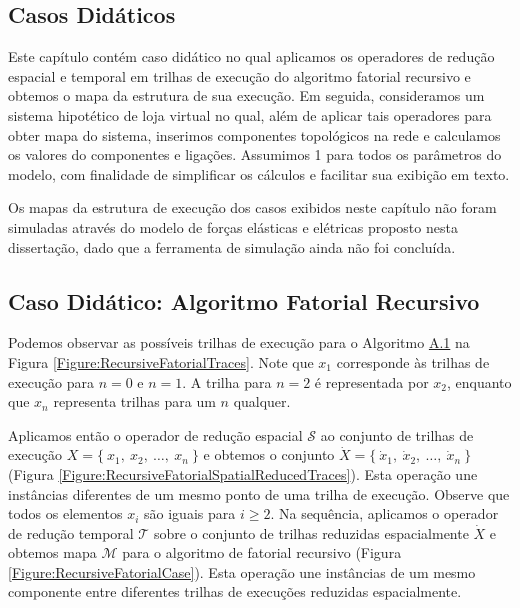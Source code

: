
%

\begin{apendicesenv}
\partapendices

\chapter{Casos Didáticos}
\label{Chapter:SpatialTemporalOperators}

Este capítulo contém caso didático no qual aplicamos os operadores de redução
espacial e temporal em trilhas de execução do algoritmo fatorial recursivo e
obtemos o mapa da estrutura de sua execução.
Em seguida, consideramos um sistema hipotético de loja virtual no qual, além de
aplicar tais operadores para obter mapa do sistema, inserimos componentes
topológicos na rede e calculamos os valores do componentes e ligações.
Assumimos 1 para todos os parâmetros do modelo, com finalidade de simplificar os
cálculos e facilitar sua exibição em texto.

Os mapas da estrutura de execução dos casos exibidos neste capítulo não foram
simuladas através do modelo de forças elásticas e elétricas proposto nesta
dissertação, dado que a ferramenta de simulação ainda não foi concluída.

\section{Caso Didático: Algoritmo Fatorial Recursivo}

Podemos observar as possíveis trilhas de execução para o Algoritmo
\hyperref[Algorithm:RecursiveFactorial]{A.1} na Figura
\ref{Figure:RecursiveFatorialTraces}. Note que $x_1$ corresponde às trilhas de
execução para $n = 0$ e $n = 1$. A trilha para $n = 2$ é representada por $x_2$,
enquanto que $x_n$ representa trilhas para um $n$ qualquer.



Aplicamos então o operador de redução espacial $\mathcal{S}$ ao conjunto 
de trilhas de execução $X = \{\ x_1,\ x_2,\ \dots,\ x_n\ \}$ e obtemos o
conjunto $\dot{X} = \{\ \dot{x}_1,\ \dot{x}_2,\ \dots,\ \dot{x}_n\ \}$ (Figura
\ref{Figure:RecursiveFatorialSpatialReducedTraces}).
Esta operação une instâncias diferentes de um mesmo ponto de uma trilha de
execução. Observe que todos os elementos $x_i$ são iguais para $i \geq 2$.
Na sequência, aplicamos o operador de redução temporal $\mathcal{T}$ sobre o
conjunto de trilhas reduzidas espacialmente $\dot{X}$ e obtemos mapa
$\mathcal{M}$ para o algoritmo de fatorial recursivo (Figura
\ref{Figure:RecursiveFatorialCase}). Esta operação une instâncias de um mesmo
componente entre diferentes trilhas de execuções reduzidas espacialmente.


\end{apendicesenv}
